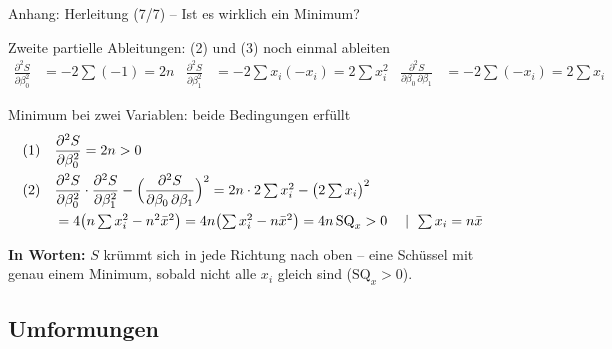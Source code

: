\documentclass[aspectratio=169,11pt]{beamer}
\newcommand{\tsum}{\textstyle\sum}
\newcommand{\SQx}{\text{SQ}_x}
\begin{document}
\begin{frame}{Anhang: Herleitung (7/7) -- Ist es wirklich ein Minimum?}
  \begin{block}{Zweite partielle Ableitungen: (2) und (3) noch einmal ableiten}
    \vspace{-8pt}
    \small
    \begin{align*}
      \frac{\partial^{2} S}{\partial \beta_0^{2}} &= -2\tsum(-1) = 2n
      & \frac{\partial^{2} S}{\partial \beta_1^{2}} &= -2\tsum x_i(-x_i) = 2\tsum x_i^{2}
      & \frac{\partial^{2} S}{\partial \beta_0\,\partial \beta_1} &= -2\tsum (-x_i) = 2\tsum x_i
    \end{align*}
    \vspace{-14pt}
  \end{block}

  \begin{block}{Minimum bei zwei Variablen: beide Bedingungen erfüllt}
    \vspace{-8pt}
    \small
    \begin{align*}
      &\text{(1)}\quad \frac{\partial^{2} S}{\partial \beta_0^{2}} = 2n > 0 \\
      &\text{(2)}\quad \frac{\partial^{2} S}{\partial \beta_0^{2}} \cdot \frac{\partial^{2} S}{\partial \beta_1^{2}}
         - \Bigl(\frac{\partial^{2} S}{\partial \beta_0\,\partial \beta_1}\Bigr)^{2}
         = 2n \cdot 2\tsum x_i^{2} - \bigl(2\tsum x_i\bigr)^{2} \\
      &\phantom{\text{(2)}\quad} = 4\bigl(n\tsum x_i^{2} - n^{2}\bar{x}^{2}\bigr)
         = 4n\bigl(\tsum x_i^{2} - n\bar{x}^{2}\bigr) = 4n\,\SQx > 0
         && \mid\ \tsum x_i = n\bar{x}
    \end{align*}
    \vspace{-14pt}
  \end{block}

  \footnotesize \textbf{In Worten:} $S$ krümmt sich in jede Richtung nach oben -- eine
  \glqq Schüssel\grqq{} mit genau einem Minimum, sobald nicht alle $x_i$ gleich sind
  ($\SQx > 0$). \hfill\hyperlink{loesungsweg}{}
\end{frame}

\subsection{Umformungen}
\end{document}
